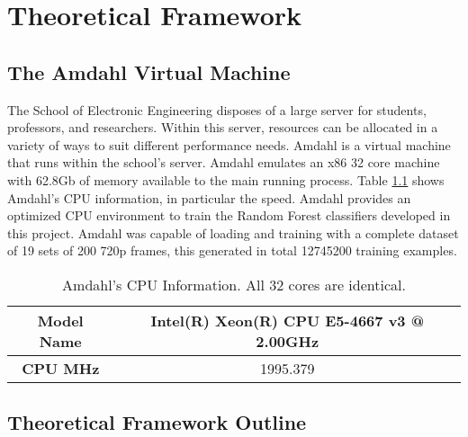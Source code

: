\chapter{Theoretical Framework}
\label{ch:marco}

\section{The Amdahl Virtual Machine}
\label{sec:theory_amdahl}
  
The School of Electronic Engineering disposes of a large server for students, professors, and researchers. Within this server, resources can be allocated in a variety of ways to suit different performance needs. Amdahl is a virtual machine that runs within the school's server. Amdahl emulates an x86 32 core machine with 62.8Gb of memory available to the main running process. Table \ref{tab:cpu-info} shows Amdahl's CPU information, in particular the speed. Amdahl provides an optimized CPU environment to train the Random Forest classifiers developed in this project. Amdahl was capable of loading and training with a complete dataset of 19 sets of 200 720p frames, this generated in total 12745200 training examples.

\begin{table}[htbp]
  \centering
  \begin{tabular}{|c|c|}
    \hline
    \textbf{Model Name} & Intel(R) Xeon(R) CPU E5-4667 v3 @ 2.00GHz \\
    \hline
    \textbf{CPU MHz} & 1995.379 \\
    \hline
  \end{tabular}
  \caption{Amdahl's CPU Information. All 32 cores are identical.}
  \label{tab:cpu-info}
\end{table}

\section{Theoretical Framework Outline}

